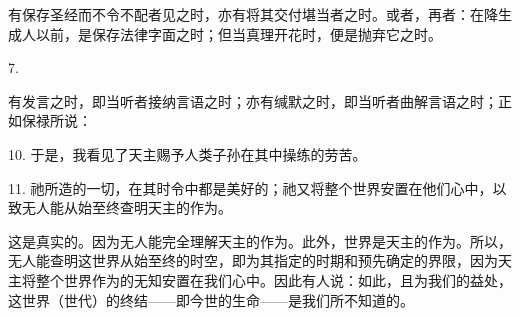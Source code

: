 有保存圣经而不令不配者见之时，亦有将其交付堪当者之时。或者，再者：在降生成人以前，是保存法律字面之时；但当真理开花时，便是抛弃它之时。\par

7. \par

有发言之时，即当听者接纳言语之时；亦有缄默之时，即当听者曲解言语之时；正如保禄所说： \par

10. 于是，我看见了天主赐予人类子孙在其中操练的劳苦。\par

11. 祂所造的一切，在其时令中都是美好的；祂又将整个世界安置在他们心中，以致无人能从始至终查明天主的作为。\par

这是真实的。因为无人能完全理解天主的作为。此外，世界是天主的作为。所以，无人能查明这世界从始至终的时空，即为其指定的时期和预先确定的界限，因为天主将整个世界作为的无知安置在我们心中。因此有人说：如此，且为我们的益处，这世界（世代）的终结——即今世的生命——是我们所不知道的。\par

